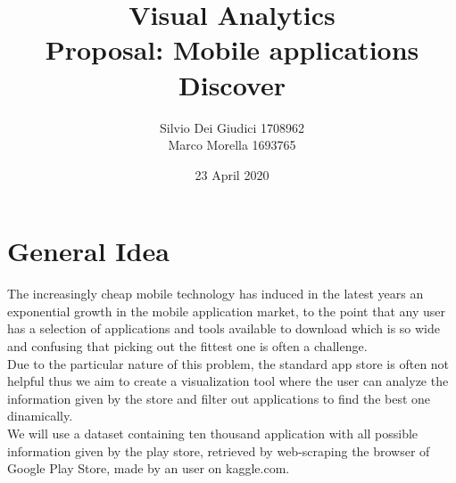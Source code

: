 \documentclass[a4paper, 11pt]{article}
\title { Visual Analytics\\ \bigskip \large Proposal: Mobile applications Discover}
\date{23 April 2020}
\author{Silvio Dei Giudici 1708962 \\ Marco Morella 1693765}
\begin{document}
\maketitle

\section{General Idea}
The increasingly cheap mobile technology has induced in the latest years an exponential growth in the mobile application market, to the point that any user has a selection of applications and tools available to download which is so wide and confusing that picking out the fittest one is often a challenge.\\
Due to the particular nature of this problem, the standard app store is often not helpful thus we aim to create a visualization tool where the user can analyze the information given by the store and filter out applications to find the best one dinamically.\\
We will use a dataset containing ten thousand application with all possible information given by the play store, retrieved by web-scraping the browser of Google Play Store, made by an user on kaggle.com.\\
\end{document}
